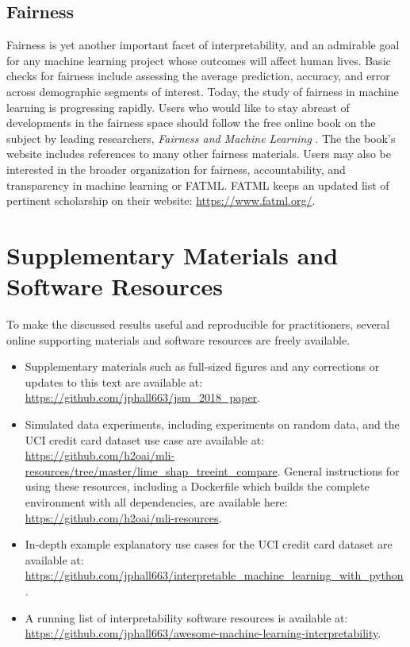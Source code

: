 \documentclass[11pt]{asaproc}
\begin{document}
\subsection{Fairness}

Fairness is yet another important facet of interpretability, and an admirable goal for any machine learning project whose outcomes will affect human lives. Basic checks for fairness include assessing the average prediction, accuracy, and error across demographic segments of interest. Today, the study of fairness in machine learning is progressing rapidly. Users who would like to stay abreast of developments in the fairness space should follow the free online book on the subject by leading researchers, \textit{Fairness and Machine Learning} \cite{fairness_book}. The the book's website includes references to many other fairness materials. Users may also be interested in the broader organization for fairness, accountability, and transparency in machine learning or FATML. FATML keeps an updated list of pertinent scholarship on their website: \url{https://www.fatml.org/}. 

\section{Supplementary Materials and Software Resources } \label{sec:software}

To make the discussed results useful and reproducible for practitioners, several online supporting materials and software resources are freely available. 

\begin{itemize}

	\item Supplementary materials such as full-sized figures and any corrections or updates to this text are available  at: \url{https://github.com/jphall663/jsm_2018_paper}.

	\item Simulated data experiments, including experiments on random data, and the UCI credit card dataset use case are available at: \url{https://github.com/h2oai/mli-resources/tree/master/lime_shap_treeint_compare}. General instructions for using these resources, including a Dockerfile which builds the complete environment with all dependencies, are available here: \url{https://github.com/h2oai/mli-resources}.

	\item In-depth example explanatory use cases for the UCI credit card dataset are available at: \url{https://github.com/jphall663/interpretable_machine_learning_with_python}.

	\item A running list of interpretability software resources is available at: \url{https://github.com/jphall663/awesome-machine-learning-interpretability}.

\end{itemize}
\end{document}
